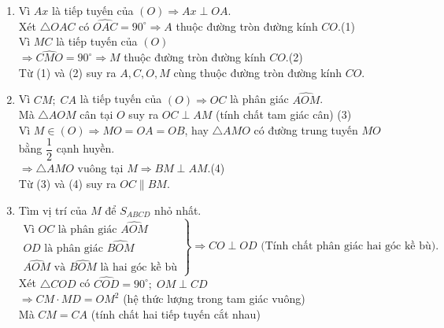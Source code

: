 \begin{vd}
{\begin{center}
		\end{center}
		\begin{enumerate}
			\item Vì $Ax$ là tiếp tuyến của $(O)\Rightarrow Ax\perp OA$.\\
			Xét $\triangle OAC$ có $\widehat{OAC} = 90^\circ\Rightarrow A$ thuộc đường tròn đường kính $CO$.\hfill (1)\\
			Vì $MC$ là tiếp tuyến của $(O)$ \\
			$\Rightarrow \widehat{CMO} = 90^\circ\Rightarrow M$ thuộc đường tròn đường kính $CO$.\hfill (2)\\
			Từ (1) và (2) suy ra $A, C, O, M$ cùng thuộc đường tròn đường kính $CO$.
			\item Vì $CM;\; CA$ là tiếp tuyến của $(O) \Rightarrow OC$ là phân giác $\widehat{AOM}$.\\
			Mà $\triangle AOM$ cân tại $O$ suy ra $OC\perp AM$ (tính chất tam giác cân) \hfill (3)\\
			Vì $M\in (O)\Rightarrow MO = OA = OB$, hay $\triangle AMO$ có đường trung tuyến $MO$ bằng $\dfrac{1}{2}$ cạnh huyền.\\
			$\Rightarrow \triangle AMO$ vuông tại $M\Rightarrow BM\perp AM$.\hfill (4)\\
			Từ (3) và (4) suy ra $OC \parallel BM$.
			\item Tìm vị trí của $M$ để $S_{ABCD}$ nhỏ nhất.\\
			$
			\left. \begin{array}{l}
			\mbox{Vì } OC \mbox{ là phân giác } \widehat{AOM}\\
			OD \mbox{ là phân giác } \widehat{BOM}\\
			\widehat{AOM}\mbox{ và } \widehat{BOM} \mbox{ là hai góc kề bù}
			\end{array} \right\}\Rightarrow CO\perp OD\mbox{ (Tính chất phân giác hai góc kề bù)}.
			$\\
			Xét $\triangle COD$ có  $\widehat{COD} = 90^\circ ;\; OM\perp CD$\\
			$\Rightarrow CM\cdot MD = OM^2$ (hệ thức lượng trong tam giác vuông)\\
			Mà $CM = CA$ (tính chất hai tiếp tuyến cắt nhau)\\

\end{enumerate}}
\end{vd}

